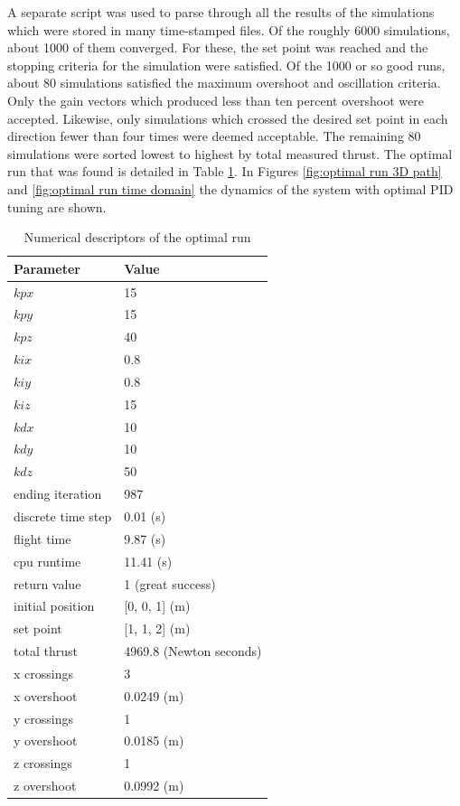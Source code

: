 A separate script was used to parse through all the results of the simulations which were stored in many time-stamped files. Of the roughly 6000 simulations, about 1000 of them converged. For these, the set point was reached and the stopping criteria for the simulation were satisfied. Of the 1000 or so good runs, about 80 simulations satisfied the maximum overshoot and oscillation criteria. Only the gain vectors which produced less than ten percent overshoot were accepted. Likewise, only simulations which crossed the desired set point in each direction fewer than four times were deemed acceptable. The remaining 80 simulations were sorted lowest to highest by total measured thrust. The optimal run that was found is detailed in Table \ref{table:optimalrun}. In Figures \ref{fig:optimal run 3D path} and \ref{fig:optimal run time domain} the dynamics of the system with optimal PID tuning are shown.


\begin{table}
\label{table:optimalrun}
\begin{doublespace}
\centering
\begin{tabular}{l l}
Parameter    & Value\\
\hline
$kpx$                 & 15 \\
$kpy$                 & 15 \\
$kpz $                & 40 \\
$kix$                 & 0.8 \\
$kiy$                 & 0.8 \\
$kiz$                 & 15 \\
$kdx$                 & 10 \\
$kdy$                 & 10 \\
$kdz$                 & 50 \\
ending iteration    & 987 \\
discrete time step   & 0.01 (s)\\
flight time         & 9.87 (s) \\
cpu runtime         & 11.41 (s)\\
return value        & 1 (great success)\\
initial position    & [0, 0, 1] (m)\\
set point           & [1, 1, 2] (m) \\
total thrust        & 4969.8 (Newton seconds) \\
x crossings         & 3 \\
x overshoot         & 0.0249 (m) \\
y crossings         & 1 \\
y overshoot         & 0.0185 (m)\\
z crossings         & 1 \\
z overshoot         & 0.0992 (m) \\
\hline
\end{tabular}
\end{doublespace}

\caption[Optimal Run]{Numerical descriptors of the optimal run}
\end{table}



